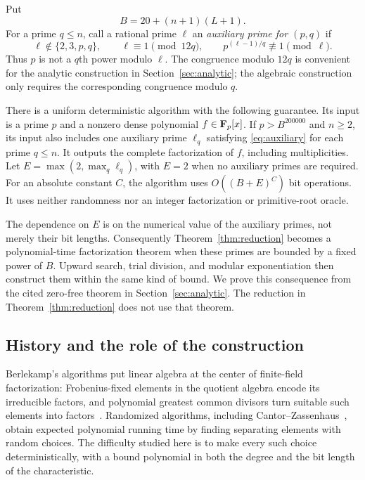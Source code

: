 Put
\begin{equation}\label{eq:B}
 B=20+(n+1)(L+1).
\end{equation}
For a prime $q\le n$, call a rational prime $\ell$ an
\emph{auxiliary prime for $(p,q)$} if
\begin{equation}\label{eq:auxiliary}
 \ell\notin\{2,3,p,q\},\qquad \ell\equiv1\pmod{12q},\qquad
 p^{(\ell-1)/q}\not\equiv1\pmod\ell.
\end{equation}
Thus $p$ is not a $q$th power modulo $\ell$. The congruence modulo $12q$
is convenient for the analytic construction in Section~\ref{sec:analytic};
the algebraic construction only requires the corresponding congruence
modulo $q$.

\begin{theorem}\label{thm:reduction}
There is a uniform deterministic algorithm with the following guarantee.
Its input is a prime $p$ and a nonzero dense polynomial $f\in\mathbf F_p[x]$.
If $p>B^{200000}$ and $n\ge2$, its input also includes one auxiliary
prime $\ell_q$ satisfying \eqref{eq:auxiliary} for each prime $q\le n$.
It outputs the complete factorization of $f$, including multiplicities.
Let $E=\max(2,\max_q\ell_q)$, with $E=2$ when no auxiliary primes are
required. For an absolute constant $C$, the algorithm uses
$O((B+E)^C)$ bit operations. It uses neither randomness nor an integer
factorization or primitive-root oracle.
\end{theorem}

The dependence on $E$ is on the numerical value of the auxiliary primes,
not merely their bit lengths. Consequently Theorem~\ref{thm:reduction}
becomes a polynomial-time factorization theorem when these primes are
bounded by a fixed power of $B$. Upward search, trial division, and modular
exponentiation then construct them within the same kind of bound. We prove
this consequence from the cited zero-free theorem in
Section~\ref{sec:analytic}. The reduction in
Theorem~\ref{thm:reduction} does not use that theorem.

\subsection{History and the role of the construction}
\label{sec:history}

Berlekamp's algorithms put linear algebra at the center of finite-field
factorization: Frobenius-fixed elements in the quotient algebra encode its
irreducible factors, and polynomial greatest common divisors turn suitable
such elements into factors~\cite{Berlekamp67,Berlekamp70}.  Randomized
algorithms, including Cantor--Zassenhaus~\cite{CantorZassenhaus81}, obtain
expected polynomial running time by finding separating elements with random
choices.  The difficulty studied here is to make every such choice
deterministically, with a bound polynomial in both the degree and the bit
length of the characteristic.

